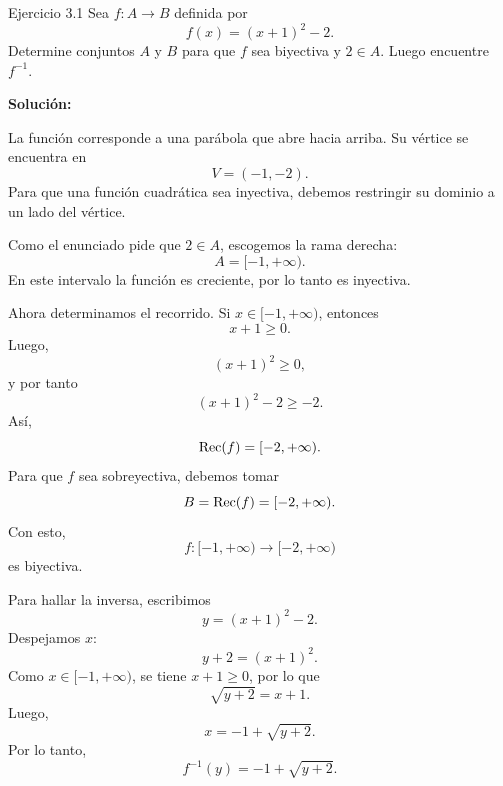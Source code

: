 \documentclass[letterpaper, 12pt]{article}
\begin{document}

\begin{solucionbox}{Ejercicio 3.1}
Sea $f:A\to B$ definida por
\[
    f(x)=(x+1)^2-2.
\]
Determine conjuntos $A$ y $B$ para que $f$ sea biyectiva y $2\in A$. Luego encuentre $f^{-1}$.

\textbf{Soluci\'on:}

La funci\'on corresponde a una par\'abola que abre hacia arriba. Su v\'ertice se encuentra en
\[
    V=(-1,-2).
\]
Para que una funci\'on cuadr\'atica sea inyectiva, debemos restringir su dominio a un lado del v\'ertice.

Como el enunciado pide que $2\in A$, escogemos la rama derecha:
\[
    A=[-1,+\infty).
\]
En este intervalo la funci\'on es creciente, por lo tanto es inyectiva.

Ahora determinamos el recorrido. Si $x\in[-1,+\infty)$, entonces
\[
    x+1\geq 0.
\]
Luego,
\[
    (x+1)^2\geq 0,
\]
y por tanto
\[
    (x+1)^2-2\geq -2.
\]
As\'i,
\[
    \operatorname{Rec}(f)=[-2,+\infty).
\]
Para que $f$ sea sobreyectiva, debemos tomar
\[
    B=\operatorname{Rec}(f)=[-2,+\infty).
\]
Con esto,
\[
    f:[-1,+\infty)\to[-2,+\infty)
\]
es biyectiva.

Para hallar la inversa, escribimos
\[
    y=(x+1)^2-2.
\]
Despejamos $x$:
\[
    y+2=(x+1)^2.
\]
Como $x\in[-1,+\infty)$, se tiene $x+1\geq 0$, por lo que
\[
    \sqrt{y+2}=x+1.
\]
Luego,
\[
    x=-1+\sqrt{y+2}.
\]
Por lo tanto,
\[
    f^{-1}(y)=-1+\sqrt{y+2}.
\]

\respuesta{$A=[-1,+\infty)$, $B=[-2,+\infty)$ y $f^{-1}(y)=-1+\sqrt{y+2}$.}
\end{solucionbox}
\end{document}
